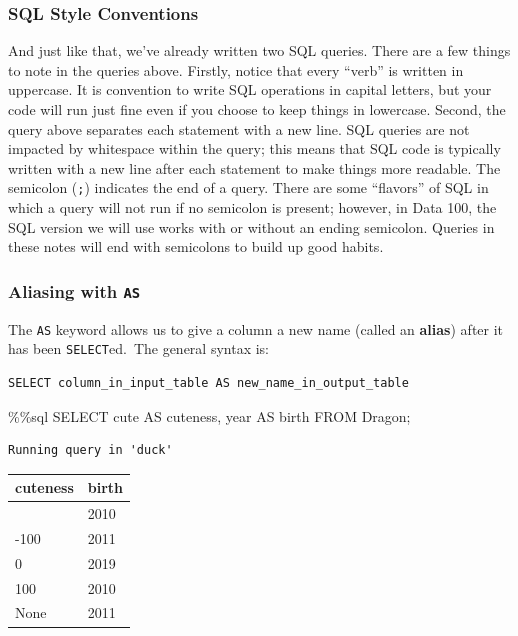 \documentclass[
  letterpaper,
  DIV=11,
  numbers=noendperiod]{scrreprt}
\newenvironment{Shaded}{\begin{snugshade}}{\end{snugshade}}
\newcommand{\NormalTok}[1]{\textcolor[rgb]{0.00,0.23,0.31}{#1}}
\newcommand{\OperatorTok}[1]{\textcolor[rgb]{0.37,0.37,0.37}{#1}}
\begin{document}
\subsubsection{SQL Style Conventions}\label{sql-style-conventions}

And just like that, we've already written two SQL queries. There are a
few things to note in the queries above. Firstly, notice that every
``verb'' is written in uppercase. It is convention to write SQL
operations in capital letters, but your code will run just fine even if
you choose to keep things in lowercase. Second, the query above
separates each statement with a new line. SQL queries are not impacted
by whitespace within the query; this means that SQL code is typically
written with a new line after each statement to make things more
readable. The semicolon (\texttt{;}) indicates the end of a query. There
are some ``flavors'' of SQL in which a query will not run if no
semicolon is present; however, in Data 100, the SQL version we will use
works with or without an ending semicolon. Queries in these notes will
end with semicolons to build up good habits.

\subsubsection{\texorpdfstring{Aliasing with
\texttt{AS}}{Aliasing with AS}}\label{aliasing-with-as}

The \texttt{AS} keyword allows us to give a column a new name (called an
\textbf{alias}) after it has been \texttt{SELECT}ed.~The general syntax
is:

\begin{verbatim}
SELECT column_in_input_table AS new_name_in_output_table
\end{verbatim}

\begin{Shaded}
\begin{Highlighting}[]
\OperatorTok{\%\%}\NormalTok{sql}
\NormalTok{SELECT cute AS cuteness, year AS birth}
\NormalTok{FROM Dragon}\OperatorTok{;}
\end{Highlighting}
\end{Shaded}

\begin{verbatim}
Running query in 'duck'
\end{verbatim}

\begin{longtable}[]{@{}ll@{}}
\toprule\noalign{}
cuteness & birth \\
\midrule\noalign{}
\endhead
\bottomrule\noalign{}
\endlastfoot
10 & 2010 \\
-100 & 2011 \\
0 & 2019 \\
100 & 2010 \\
None & 2011 \\
\end{longtable}
\end{document}
